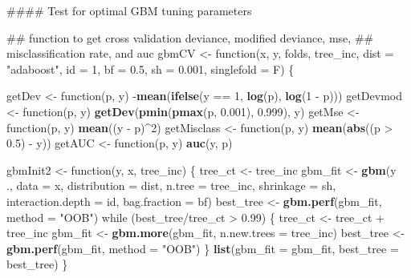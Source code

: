 \documentclass[11pt,]{article}
\newenvironment{Shaded}{\begin{snugshade}}{\end{snugshade}}
\newcommand{\KeywordTok}[1]{\textcolor[rgb]{0.13,0.29,0.53}{\textbf{{#1}}}}
\newcommand{\DataTypeTok}[1]{\textcolor[rgb]{0.13,0.29,0.53}{{#1}}}
\newcommand{\DecValTok}[1]{\textcolor[rgb]{0.00,0.00,0.81}{{#1}}}
\newcommand{\FloatTok}[1]{\textcolor[rgb]{0.00,0.00,0.81}{{#1}}}
\newcommand{\StringTok}[1]{\textcolor[rgb]{0.31,0.60,0.02}{{#1}}}
\newcommand{\NormalTok}[1]{{#1}}
\begin{document}
\begin{Shaded}
\begin{Highlighting}[]
{\NormalTok{#### Test for optimal GBM tuning parameters}

\NormalTok{## function to get cross validation deviance, modified deviance, mse,}
\NormalTok{## misclassification rate, and auc}
\NormalTok{gbmCV <-}\StringTok{ }\NormalTok{function(x, y, folds, tree_inc, }\DataTypeTok{dist =} \StringTok{"adaboost"}\NormalTok{, }\DataTypeTok{id =} \DecValTok{1}\NormalTok{, }\DataTypeTok{bf =} \FloatTok{0.5}\NormalTok{, }
    \DataTypeTok{sh =} \FloatTok{0.001}\NormalTok{, }\DataTypeTok{singlefold =} \NormalTok{F) \{}
    
    \NormalTok{getDev <-}\StringTok{ }\NormalTok{function(p, y) -}\KeywordTok{mean}\NormalTok{(}\KeywordTok{ifelse}\NormalTok{(y ==}\StringTok{ }\DecValTok{1}\NormalTok{, }\KeywordTok{log}\NormalTok{(p), }\KeywordTok{log}\NormalTok{(}\DecValTok{1} \NormalTok{-}\StringTok{ }\NormalTok{p)))}
    \NormalTok{getDevmod <-}\StringTok{ }\NormalTok{function(p, y) }\KeywordTok{getDev}\NormalTok{(}\KeywordTok{pmin}\NormalTok{(}\KeywordTok{pmax}\NormalTok{(p, }\FloatTok{0.001}\NormalTok{), }\FloatTok{0.999}\NormalTok{), y)}
    \NormalTok{getMse <-}\StringTok{ }\NormalTok{function(p, y) }\KeywordTok{mean}\NormalTok{((y -}\StringTok{ }\NormalTok{p)^}\DecValTok{2}\NormalTok{)}
    \NormalTok{getMisclass <-}\StringTok{ }\NormalTok{function(p, y) }\KeywordTok{mean}\NormalTok{(}\KeywordTok{abs}\NormalTok{((p >}\StringTok{ }\FloatTok{0.5}\NormalTok{) -}\StringTok{ }\NormalTok{y))}
    \NormalTok{getAUC <-}\StringTok{ }\NormalTok{function(p, y) }\KeywordTok{auc}\NormalTok{(y, p)}
    
    \NormalTok{gbmInit2 <-}\StringTok{ }\NormalTok{function(y, x, tree_inc) \{}
        \NormalTok{tree_ct <-}\StringTok{ }\NormalTok{tree_inc}
        \NormalTok{gbm_fit <-}\StringTok{ }\KeywordTok{gbm}\NormalTok{(y ~}\StringTok{ }\NormalTok{., }\DataTypeTok{data =} \NormalTok{x, }\DataTypeTok{distribution =} \NormalTok{dist, }\DataTypeTok{n.tree =} \NormalTok{tree_inc, }
            \DataTypeTok{shrinkage =} \NormalTok{sh, }\DataTypeTok{interaction.depth =} \NormalTok{id, }\DataTypeTok{bag.fraction =} \NormalTok{bf)}
        \NormalTok{best_tree <-}\StringTok{ }\KeywordTok{gbm.perf}\NormalTok{(gbm_fit, }\DataTypeTok{method =} \StringTok{"OOB"}\NormalTok{)}
        \NormalTok{while (best_tree/tree_ct >}\StringTok{ }\FloatTok{0.99}\NormalTok{) \{}
            \NormalTok{tree_ct <-}\StringTok{ }\NormalTok{tree_ct +}\StringTok{ }\NormalTok{tree_inc}
            \NormalTok{gbm_fit <-}\StringTok{ }\KeywordTok{gbm.more}\NormalTok{(gbm_fit, }\DataTypeTok{n.new.trees =} \NormalTok{tree_inc)}
            \NormalTok{best_tree <-}\StringTok{ }\KeywordTok{gbm.perf}\NormalTok{(gbm_fit, }\DataTypeTok{method =} \StringTok{"OOB"}\NormalTok{)}
        \NormalTok{\}}
        \KeywordTok{list}\NormalTok{(}\DataTypeTok{gbm_fit =} \NormalTok{gbm_fit, }\DataTypeTok{best_tree =} \NormalTok{best_tree)}
    \NormalTok{\}}
    
}
\end{Highlighting}
\end{Shaded}
\end{document}
